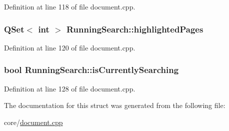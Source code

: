 Definition at line 118 of file document.\+cpp.

\hypertarget{structRunningSearch_a5827c4228354199d0a4447dca7f19fb1}{
\subsubsection[{highlighted\+Pages}]{\setlength{\rightskip}{0pt plus 5cm}Q\+Set$<$ int $>$ Running\+Search\+::highlighted\+Pages}}\label{structRunningSearch_a5827c4228354199d0a4447dca7f19fb1}


Definition at line 120 of file document.\+cpp.

\hypertarget{structRunningSearch_a2683a901cf457f541ca4662294e02cec}{
\subsubsection[{is\+Currently\+Searching}]{\setlength{\rightskip}{0pt plus 5cm}bool Running\+Search\+::is\+Currently\+Searching}}\label{structRunningSearch_a2683a901cf457f541ca4662294e02cec}


Definition at line 128 of file document.\+cpp.



The documentation for this struct was generated from the following file\+:\begin{DoxyCompactItemize}
\item 
core/\hyperlink{core_2document_8cpp}{document.\+cpp}\end{DoxyCompactItemize}
